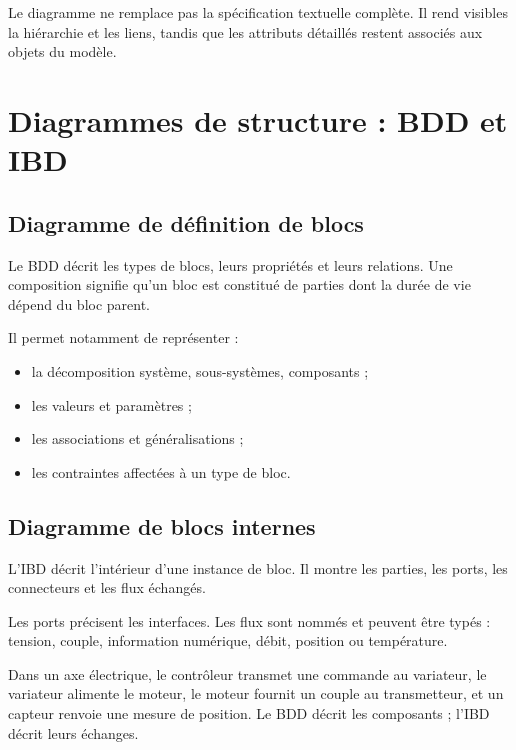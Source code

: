 \ISDiagrammeExigences

Le diagramme ne remplace pas la spécification textuelle complète. Il rend visibles la hiérarchie et les liens, tandis que les attributs détaillés restent associés aux objets du modèle.

\section{Diagrammes de structure : BDD et IBD}\label{sec:is-bdd-ibd}

\ISBDDIBD

\subsection{Diagramme de définition de blocs}

Le BDD décrit les types de blocs, leurs propriétés et leurs relations. Une composition signifie qu'un bloc est constitué de parties dont la durée de vie dépend du bloc parent.

Il permet notamment de représenter :
\begin{itemize}
  \item la décomposition système, sous-systèmes, composants ;
  \item les valeurs et paramètres ;
  \item les associations et généralisations ;
  \item les contraintes affectées à un type de bloc.
\end{itemize}

\subsection{Diagramme de blocs internes}

L'IBD décrit l'intérieur d'une instance de bloc. Il montre les parties, les ports, les connecteurs et les flux échangés.

Les ports précisent les interfaces. Les flux sont nommés et peuvent être typés : tension, couple, information numérique, débit, position ou température.

\begin{ISapplication}[title={Chaîne d'un axe motorisé}]
Dans un axe électrique, le contrôleur transmet une commande au variateur, le variateur alimente le moteur, le moteur fournit un couple au transmetteur, et un capteur renvoie une mesure de position. Le BDD décrit les composants ; l'IBD décrit leurs échanges.
\end{ISapplication}

